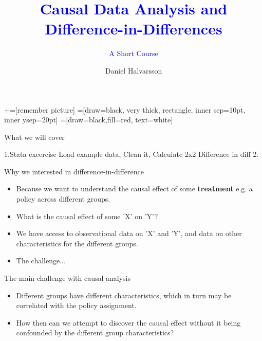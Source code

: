 \documentclass[notes,11pt, aspectratio=169]{beamer}
\title[]{\textcolor{blue}{Causal Data Analysis and Difference-in-Differences}}
\subtitle[]{\textcolor{blue}{A Short Course}}
\author[DH]{Daniel Halvarsson}
\institute{The Ratio Institute, Stockholm\\
\vspace{0.2cm}
 \href{daniel.halvarsson@ratio.se}{daniel.halvarsson@ratio.se}}
\date{}
\begin{document}
\newcommand\marktopleft[1]{%
    \tikz[overlay,remember picture] 
        \node (marker-#1-a) at (-.3em,.3em) {};%
}
\newcommand\markbottomright[2]{%
    \tikz[overlay,remember picture] 
        \node (marker-#1-b) at (0em,0em) {};%
}
+=[remember picture] 
 =[draw=black, very thick, rectangle, inner sep=10pt, inner ysep=20pt]
 =[draw=black,fill=red, text=white]

\begin{frame}
\maketitle
\end{frame}

\begin{frame}{What we will cover}

1.Stata excercise Load example data, Clean it, Calculate 2x2 Difference in diff 
2. 
\end{frame}

\begin{frame}{Why we interested in difference-in-difference}
    \begin{itemize}
        \item Because we want to understand the causal effect of some \textbf{treatment} e.g. a policy across different groups.
        \item What is the causal effect of some 'X' on 'Y'?
        \item We have access to observational data on 'X' and 'Y', and data on other characteristics for the different groups.
        \item The challenge...
    \end{itemize}
\end{frame}

\begin{frame}{The main challenge with causal analysis}
    \begin{itemize}
        \item Different groups have different characteristics, which in turn may be correlated with the policy assignment.
        \item How then can we attempt to discover the causal effect without it being confounded by the different group characteristics?
    \end{itemize}
\end{frame}
\end{document}
